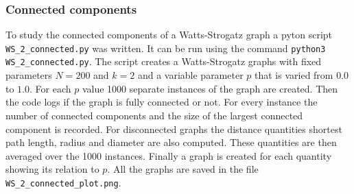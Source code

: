 \subsubsection{Connected components}

To study the connected components of a Watts-Strogatz graph a pyton script \verb+WS_2_connected.py+ was written. It can be run using the command \verb+python3 WS_2_connected.py+. The script creates a Watts-Strogatz graphs with fixed parameters $N=200$ and $k=2$ and a variable parameter $p$ that is varied from $0.0$ to $1.0$. For each $p$ value 1000 separate instances of the graph are created. Then the code logs if the graph is fully connected or not.  For every instance the number of connected components and the size of the largest connected component is recorded. For disconnected graphs the distance quantities shortest path length, radius and diameter are also computed. These quantities are then averaged over the 1000 instances. Finally a graph is created for each quantity showing its relation to $p$. All the graphs are saved in the file \verb+WS_2_connected_plot.png+.